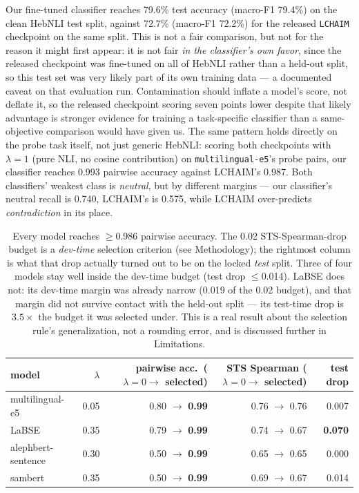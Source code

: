 \documentclass{article}
\begin{document}
Our fine-tuned classifier reaches 79.6\% test accuracy (macro-F1 79.4\%) on
the clean HebNLI test split, against 72.7\% (macro-F1 72.2\%) for the
released \texttt{LCHAIM} checkpoint on the same split. This is not a fair
comparison, but not for the reason it might first appear: it is not fair
\emph{in the classifier's own favor}, since the released checkpoint was
fine-tuned on all of HebNLI rather than a held-out split, so this test set
was very likely part of its own training data --- a documented caveat on
that evaluation run. Contamination should inflate a model's score, not
deflate it, so the released checkpoint scoring seven points lower despite
that likely advantage is stronger evidence for training a task-specific
classifier than a same-objective comparison would have given us. The same
pattern holds directly on the probe task itself, not just generic HebNLI:
scoring both checkpoints with $\lambda=1$ (pure NLI, no cosine
contribution) on \texttt{multilingual-e5}'s probe pairs, our classifier
reaches 0.993 pairwise accuracy against LCHAIM's 0.987. Both classifiers'
weakest class is \emph{neutral}, but by different margins --- our
classifier's neutral recall is 0.740, LCHAIM's is 0.575, while LCHAIM
over-predicts \emph{contradiction} in its place.

\begin{table}[h]
\centering
\small
\begin{tabular}{lrrrr}
\toprule
model & $\lambda$ & pairwise acc.\ ($\lambda{=}0 \to$ selected) & STS Spearman ($\lambda{=}0 \to$ selected) & test drop \\
\midrule
multilingual-e5 & 0.05 & 0.80 $\to$ \textbf{0.99} & 0.76 $\to$ 0.76 & 0.007 \\
LaBSE & 0.35 & 0.79 $\to$ \textbf{0.99} & 0.74 $\to$ 0.67 & \textbf{0.070} \\
alephbert-sentence & 0.30 & 0.50 $\to$ \textbf{0.99} & 0.65 $\to$ 0.65 & 0.000 \\
sambert & 0.35 & 0.50 $\to$ \textbf{0.99} & 0.69 $\to$ 0.67 & 0.014 \\
\bottomrule
\end{tabular}
\caption{Every model reaches $\geq$0.986 pairwise accuracy. The 0.02
STS-Spearman-drop budget is a \emph{dev-time} selection criterion (see
Methodology); the rightmost column is what that drop actually turned out to
be on the locked \emph{test} split. Three of four models stay well inside
the dev-time budget (test drop $\leq$0.014). LaBSE does not: its dev-time
margin was already narrow (0.019 of the 0.02 budget), and that margin did
not survive contact with the held-out split --- its test-time drop is
$3.5\times$ the budget it was selected under. This is a real result about
the selection rule's generalization, not a rounding error, and is discussed
further in Limitations.}
\label{tab:nlirerank}
\end{table}
\end{document}
